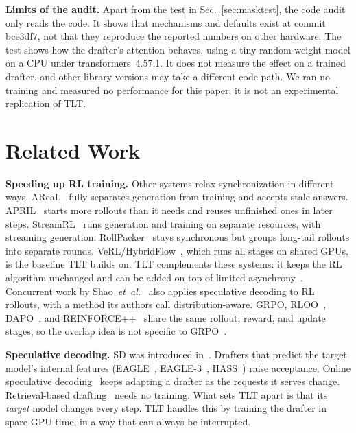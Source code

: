 \documentclass[conference]{IEEEtran}
\newcommand{\brkus}{\textunderscore\allowbreak}
\newcommand{\code}[1]{{\small\ttfamily\let\_\brkus\hyphenchar\font=-1 #1}}
\begin{document}
\textbf{Limits of the audit.} Apart from the test in Sec.~\ref{sec:masktest}, the code audit only reads the code. It shows that mechanisms and defaults exist at commit \code{bce3df7}, not that they reproduce the reported numbers on other hardware. The test shows how the drafter's attention behaves, using a tiny random-weight model on a CPU under \code{transformers}~4.57.1. It does not measure the effect on a trained drafter, and other library versions may take a different code path. We ran no training and measured no performance for this paper; it is not an experimental replication of TLT.

\section{Related Work}
\label{sec:related}

\textbf{Speeding up RL training.} Other systems relax synchronization in different ways. AReaL~\cite{fu2025areal} fully separates generation from training and accepts stale answers. APRIL~\cite{zhou2025april} starts more rollouts than it needs and reuses unfinished ones in later steps. StreamRL~\cite{zhong2025streamrl} runs generation and training on separate resources, with streaming generation. RollPacker~\cite{gao2025rollpacker} stays synchronous but groups long-tail rollouts into separate rounds. VeRL/HybridFlow~\cite{sheng2025hybridflow}, which runs all stages on shared GPUs, is the baseline TLT builds on. TLT complements these systems: it keeps the RL algorithm unchanged and can be added on top of limited asynchrony~\cite[Secs.~7--8]{hu2026tlt}. Concurrent work by Shao~\emph{et~al.}~\cite{shao2025beat} also applies speculative decoding to RL rollouts, with a method its authors call distribution-aware. GRPO, RLOO~\cite{ahmadian2024rloo}, DAPO~\cite{yu2025dapo}, and REINFORCE++~\cite{hu2025reinforcepp} share the same rollout, reward, and update stages, so the overlap idea is not specific to GRPO~\cite[Sec.~7]{hu2026tlt}.

\textbf{Speculative decoding.} SD was introduced in~\cite{leviathan2023,chen2023}. Drafters that predict the target model's internal features (EAGLE~\cite{li2024eagle}, EAGLE-3~\cite{li2025eagle3}, HASS~\cite{zhang2025hass}) raise acceptance. Online speculative decoding~\cite{liu2024osd} keeps adapting a drafter as the requests it serves change. Retrieval-based drafting~\cite{zhao2024lookahead} needs no training. What sets TLT apart is that its \emph{target} model changes every step. TLT handles this by training the drafter in spare GPU time, in a way that can always be interrupted.
\end{document}
